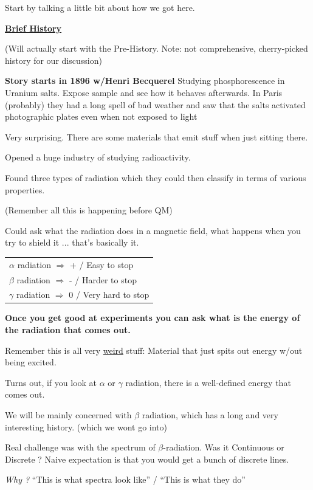 {\clearpage

Start by talking a little bit about how we got here.

\textbf{\underline{Brief History} } 

(Will actually start with the Pre-History. Note: not comprehensive, cherry-picked history for our discussion) 

\textbf{Story starts in 1896 w/Henri Becquerel}
Studying phosphorescence in Uranium salts. Expose sample and see how it behaves afterwards.  
In Paris (probably) they had a long spell of bad weather and saw that the salts activated photographic plates even when not exposed to light

Very surprising. There are some materials that emit stuff when just sitting there.

Opened a huge industry of studying radioactivity.

Found three types of radiation which they could then classify in terms of various properties. 

(Remember all this is happening before QM) 

Could ask what the radiation does in a magnetic field, what happens when you try to shield it ... that's basically it.

\begin{tabular}{l}
$\alpha$ radiation $\Rightarrow$ +  / Easy to stop\\
$\beta$ radiation $\Rightarrow$ -  / Harder to stop \\
$\gamma$ radiation $\Rightarrow$ 0 / Very hard to stop \\
\end{tabular}

\textbf{Once you get good at experiments you can ask what is the energy of the radiation that comes out.}

Remember this is all very \underline{weird} stuff: Material that just spits out energy w/out being excited.

Turns out, if you look at $\alpha$ or $\gamma$ radiation, there is a well-defined energy that comes out. 

We will be mainly concerned with $\beta$ radiation, which has a long and very interesting history. (which we wont go into) 

Real challenge was with the spectrum of $\beta$-radiation. 
Was it Continuous or Discrete ?
Naive expectation is that you would get a bunch of discrete lines.  

\textit{Why ?}  ``This is what spectra look like'' / ``This is what they do''

}
